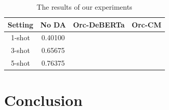 \documentclass{article}
\begin{document}
\begin{table}[h]
	\centering
	\caption{The results of our experiments}
	\begin{tabular}{cccc}
		\toprule
		Setting & No DA & Orc-DeBERTa & Orc-CM \\
		\midrule
		1-shot & 0.40100 &  &  \\
		3-shot & 0.65675 &  &  \\
		5-shot & 0.76375 &  &  \\
		\bottomrule
	\end{tabular}
	\label{tab:results}
\end{table}

\section{Conclusion}



\end{document}
